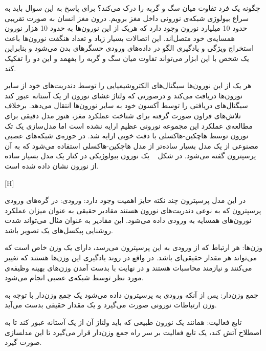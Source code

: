 چگونه یک فرد تفاوت میان سگ و گربه را درک می‌کند؟ برای پاسخ به این سوال باید به سراغ بیولوژی شبکه‌ی نورونی داخل مغز برویم. درون مغز انسان به صورت تقریبی حدود 10 میلیارد نورون وجود دارد که هریک از این نورون‌ها به حدود 10 هزار نورون همسایه‌ی خود متصل‌اند. این اتصالات بسیار زیاد و تعداد هنگفت نورون‌ها باعث استخراج ویژگی و یادگیری الگو در داده‌های ورودی حسگرهای بدن می‌شود و بنابراین یک شخص با این ابزار می‌تواند تفاوت میان سگ و گربه را بفهمد و این دو را تفکیک کند.


هر یک از این نورون‌ها سیگنال‌های الکتروشیمیایی را توسط دندریت‌های خود از سایر نورون‌ها دریافت می‌کند و درصورتی که ولتاژ غشای نورون از یک آستانه عبور کند سیگنال‌های دریافتی را توسط آکسون خود به سایر نورون‌ها انتقال می‌دهد. برخلاف تلاش‌های فراون صورت گرفته برای شناخت عملکرد مغز، هنوز مدل دقیقی برای مطالعه‌ی عملکرد این مجموعه نورونی عظیم ارایه نشده است اما مدل‌سازی یک تک نورون توسط هاچکین-هاکسلی  با دقت خوبی ارایه شد. در حوزه‌ی شبکه‌های عصبی مصنوعی از یک مدل بسیار ساده‌تر از مدل هاچکین-هاکسلی استفاده می‌شود که به آن پرسپترون گفته می‌شود. در شکل ~ یک نورون بیولوژیکی در کنار یک مدل بسیار ساده از نورون نشان داده شده است.

[H]

در این مدل پرسپترون چند نکته حایز اهمیت وجود دارد:
 ورودی: در گره‌های ورودی پرسپترون که به نوعی دندریت‌های نورون هستند مقادیر حقیقی به عنوان میزان عملکرد نورون‌های همسایه به ورودی داده می‌شود. این مقادیر به عنوان مثال می‌تواند شدت روشنایی پیکسل‌های یک تصویر باشد.

 وزن‌ها: هر ارتباط که از ورودی به این پرسپترون می‌رسد، دارای یک وزن خاص است که می‌تواند هر مقدار حقیقی‌ای باشد. در واقع در روند یادگیری این وزن‌ها هستند که تغییر می‌کنند و نیازمند محاسبات هستند و در نهایت با بدست آمدن وزن‌های بهینه وظیفه‌ی مورد نظر توسط شبکه‌ی عصبی انجام می‌شود.

 جمع وزن‌دار: پس از آنکه ورودی به پرسپترون داده می‌شود یک جمع وزن‌دار با توجه به وزن ارتباطات نورونی صورت می‌گیرد و یک مقدار حقیقی بدست می‌آید.

 تابع فعالیت: همانند یک نورون طبیعی که باید ولتاژ آن از یک آستانه عبور کند تا به اصطلاح آتش کند، یک تابع فعالیت بر سر راه جمع وزن‌دار قرار می‌گیرد تا این مدلسازی صورت گیرد.

